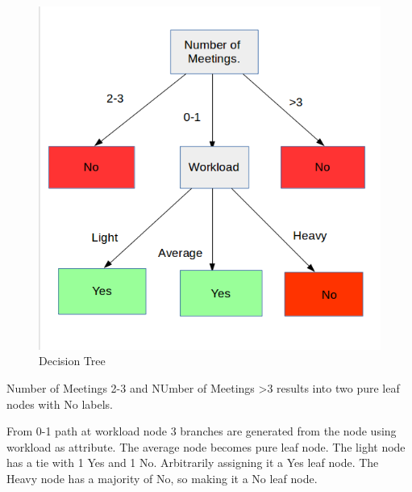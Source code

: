\documentclass[a4paper,11pt]{article}
\begin{document}
\begin{mlsolution}
\begin{figure}[th]
\includegraphics[width=0.6\columnwidth]{q4/dt.png}%

\caption{Decision Tree}
\label{fig:proto}%
\end{figure}

Number of Meetings 2-3 and NUmber of Meetings >3 results into two pure leaf nodes with  No labels.

From 0-1 path at workload node 3 branches are generated from the node using workload as attribute. The average node becomes pure leaf node. The light node has a tie with  1 Yes and 1 No. Arbitrarily assigning it a Yes leaf node. The Heavy node has a majority of No, so making it a No leaf node.
\end{mlsolution}
\end{document}
